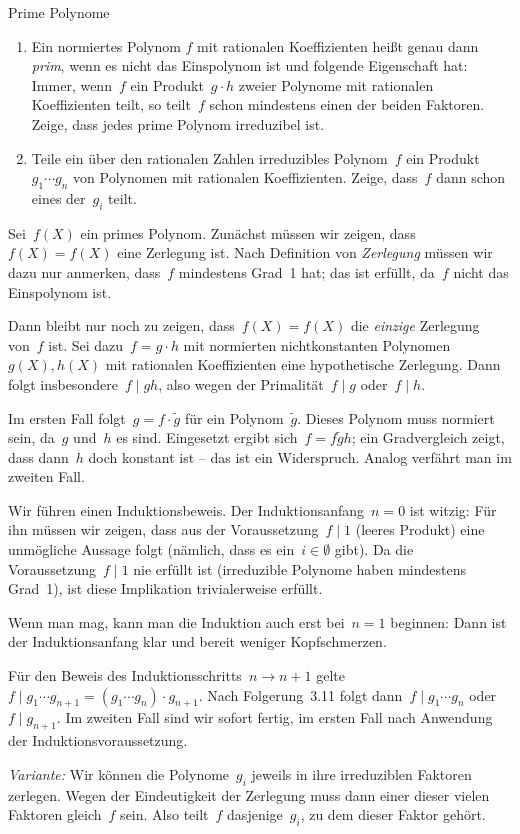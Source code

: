 \documentclass{algblatt}
\begin{document}
\ifloesungen\newpage\fi
\begin{aufgabe}{Prime Polynome}
\begin{enumerate}
\item Ein normiertes Polynom $f$ mit rationalen Koeffizienten heißt
genau dann \emph{prim}, wenn es nicht das Einspolynom ist und folgende
Eigenschaft hat: Immer, wenn~$f$ ein
Produkt~$g \cdot h$ zweier Polynome mit
rationalen Koeffizienten teilt, so teilt~$f$ schon mindestens einen der
beiden Faktoren. Zeige, dass jedes prime Polynom irreduzibel ist.
\item Teile ein über den rationalen Zahlen irreduzibles Polynom~$f$ ein
Produkt~$g_1 \cdots g_n$ von Polynomen mit rationalen Koeffizienten.
Zeige, dass~$f$ dann schon eines der~$g_i$ teilt.
\end{enumerate}

\begin{loesungE}
\item Sei~$f(X)$ ein primes Polynom. Zunächst müssen wir zeigen, dass~$f(X) =
f(X)$ eine Zerlegung ist. Nach Definition von \emph{Zerlegung} müssen wir dazu
nur anmerken, dass~$f$ mindestens Grad~1 hat; das ist erfüllt, da~$f$ nicht das
Einspolynom ist.

Dann bleibt nur noch zu zeigen, dass~$f(X) = f(X)$
die \emph{einzige} Zerlegung von~$f$ ist. Sei dazu~$f = g \cdot h$ mit
normierten nichtkonstanten Polynomen~$g(X), h(X)$ mit rationalen Koeffizienten
eine hypothetische Zerlegung.
Dann folgt insbesondere~$f \mid gh$, also wegen der Primalität~$f \mid g$ oder~$f
\mid h$.

Im ersten Fall folgt~$g = f \cdot \widetilde g$ für ein
Polynom~$\widetilde g$. Dieses Polynom muss normiert sein, da~$g$ und~$h$ es
sind. Eingesetzt ergibt sich~$f = f \widetilde g h$; ein Gradvergleich zeigt,
dass dann~$h$ doch konstant ist -- das ist ein Widerspruch. Analog verfährt man
im zweiten Fall.

\item Wir führen einen Induktionsbeweis. Der Induktionsanfang~$n = 0$ ist
witzig: Für ihn müssen wir zeigen, dass aus der Voraussetzung~$f \mid 1$
(leeres Produkt) eine unmögliche Aussage folgt (nämlich, dass es ein~$i \in
\emptyset$ gibt). Da die Voraussetzung~$f \mid 1$ nie erfüllt ist (irreduzible
Polynome haben mindestens Grad~1), ist diese Implikation trivialerweise
erfüllt.

Wenn man mag, kann man die Induktion auch erst bei~$n = 1$ beginnen: Dann ist
der Induktionsanfang klar und bereit weniger Kopfschmerzen.

Für den Beweis des Induktionsschritts~$n \to n + 1$ gelte~$f \mid g_1 \cdots
g_{n+1} = (g_1 \cdots g_n) \cdot g_{n+1}$. Nach Folgerung~3.11 folgt dann~$f
\mid g_1 \cdots g_n$ oder~$f \mid g_{n+1}$. Im zweiten Fall sind wir sofort
fertig, im ersten Fall nach Anwendung der Induktionsvoraussetzung.

\emph{Variante:} Wir können die Polynome~$g_i$ jeweils in ihre irreduziblen
Faktoren zerlegen. Wegen der Eindeutigkeit der Zerlegung muss dann einer dieser
vielen Faktoren gleich~$f$ sein. Also teilt~$f$ dasjenige~$g_i$, zu dem dieser
Faktor gehört.
\end{loesungE}
\end{aufgabe}
\end{document}

